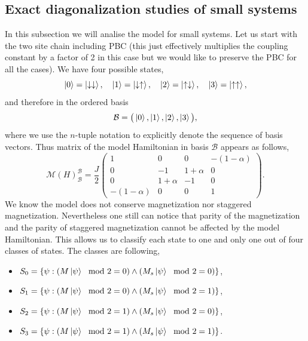 \documentclass[12pt, a4paper]{article}
\begin{document}
\subsection{Exact diagonalization studies of small systems}
In this subsection we will analise the model for small systems. Let us start with the two site chain including PBC (this just effectively multiplies the coupling constant by a factor of 2 in this case but we would like to preserve the PBC for all the cases). We have four possible states,
\begin{equation}
\ket{0} = \ket{\downarrow\downarrow}, \quad \ket{1} = \ket{\downarrow\uparrow}, \quad \ket{2} = \ket{\uparrow\downarrow}, \quad \ket{3} = \ket{\uparrow\uparrow},
\end{equation}
and therefore in the ordered basis
\begin{equation}
\mathcal{B} = \big(\ket{0}, \ket{1}, \ket{2}, \ket{3}\big),
\end{equation}
where we use the $n$-tuple notation to explicitly denote the sequence of basis vectors. Thus matrix of the model Hamiltonian in basis $\mathcal{B}$ appears as follows,
\begin{equation}
\mathcal{M}(H)_{\mathcal{B}}^{\mathcal{B}} = \frac{J}{2} \begin{pmatrix}
1 & 0 & 0 & -(1-\alpha) \\
0 & -1 & 1+\alpha & 0 \\
0 & 1+\alpha & -1 & 0 \\
-(1-\alpha) & 0 & 0 & 1
\end{pmatrix}.
\end{equation}
We know the model does not conserve magnetization nor staggered magnetization. Nevertheless one still can notice that parity of the magnetization and the parity of staggered magnetization cannot be affected by the model Hamiltonian. This allows us to classify each state to one and only one out of four classes of states. The classes are following,
\begin{itemize}
	\item $S_0 = \{\psi : (M\ket{\psi}\mod 2 = 0) \land  (M_s \ket{\psi}\mod 2 = 0)\}$,
	\item $S_1 = \{\psi : (M\ket{\psi}\mod 2 = 0) \land  (M_s \ket{\psi}\mod 2 = 1)\}$,
	\item $S_2 = \{\psi : (M\ket{\psi}\mod 2 = 1) \land  (M_s \ket{\psi}\mod 2 = 0)\}$,
	\item $S_3 = \{\psi : (M\ket{\psi}\mod 2 = 1) \land  (M_s \ket{\psi}\mod 2 = 1)\}$.
\end{itemize}
\end{document}
